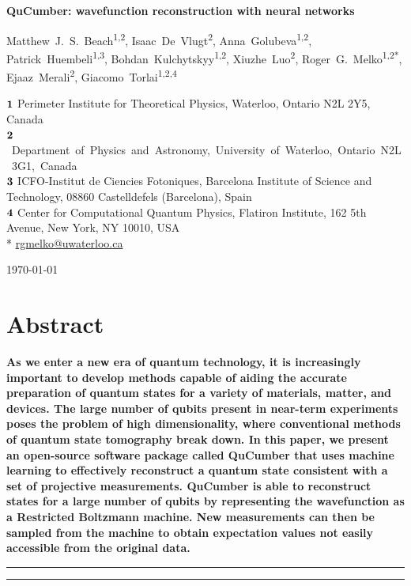 \documentclass[submission, Phys, hidelnks]{SciPost}
\begin{document}
\begin{center}{\Large \textbf{
    QuCumber: wavefunction reconstruction with neural networks
}}\end{center}

\begin{center}
    Matthew~J.~S.~Beach\textsuperscript{1,2},
    Isaac~De~Vlugt\textsuperscript{2},
    Anna~Golubeva\textsuperscript{1,2},
    Patrick~Huembeli\textsuperscript{1,3},
    Bohdan~Kulchytskyy\textsuperscript{1,2},
    Xiuzhe~Luo\textsuperscript{2},
    Roger~G.~Melko\textsuperscript{1,2*},
    Ejaaz~Merali\textsuperscript{2},
    Giacomo~Torlai\textsuperscript{1,2,4}
\end{center}

\begin{center}
    ${\bf 1}$ Perimeter Institute for Theoretical Physics, Waterloo,
    Ontario N2L 2Y5, Canada
    \\
    \mbox{${\bf 2}$ Department of Physics and Astronomy, University of Waterloo,
    Ontario N2L 3G1, Canada}
    \\
    ${\bf 3}$ ICFO-Institut de Ciencies Fotoniques, Barcelona Institute of Science and Technology,
    08860 Castelldefels (Barcelona), Spain
    \\
    ${\bf 4}$ Center for Computational Quantum Physics, Flatiron Institute,
    162 5th Avenue, New York, NY 10010, USA\\

    * \href{mailto:rgmelko@uwaterloo.ca}{rgmelko@uwaterloo.ca}
\end{center}
\begin{center}
    \today
\end{center}
\section*{Abstract}
{\bf
As we enter a new era of quantum technology, it is increasingly important to
develop methods capable of aiding the accurate preparation of quantum states
for a variety of materials, matter, and devices. The large number of qubits
present in near-term experiments poses the problem of high dimensionality,
where conventional methods of quantum state tomography break down.
In this paper, we present an open-source software package called QuCumber that
uses machine learning to effectively reconstruct a quantum state consistent
with a set of projective measurements. QuCumber is able to reconstruct states
for a large number of qubits by representing the wavefunction as a Restricted
Boltzmann machine. New measurements can then be sampled from the machine to
obtain expectation values not easily accessible from the original data.
}
\noindent\rule{\textwidth}{1pt}
\tableofcontents\thispagestyle{fancy}
\noindent\rule{\textwidth}{1pt}
\end{document}
